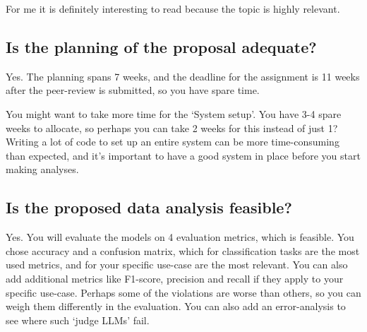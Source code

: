 \documentclass{article}
\begin{document}
For me it is definitely interesting to read because the topic is highly relevant.

\subsection{Is the planning of the proposal adequate?}

Yes. The planning spans 7 weeks, and the deadline for the assignment is 11 weeks after the peer-review is submitted, so you have spare time.

You might want to take more time for the `System setup'. You have 3-4 spare weeks to allocate, so perhaps you can take 2 weeks for this instead of just 1? Writing a lot of code to set up an entire system can be more time-consuming than expected, and it's important to have a good system in place before you start making analyses.


\subsection{Is the proposed data analysis feasible?}

Yes. You will evaluate the models on 4 evaluation metrics, which is feasible. You chose accuracy and a confusion matrix, which for classification tasks are the most used metrics, and for your specific use-case are the most relevant. You can also add additional metrics like F1-score, precision and recall if they apply to your specific use-case. Perhaps some of the violations are worse than others, so you can weigh them differently in the evaluation. You can also add an error-analysis to see where such `judge LLMs' fail.
\end{document}
